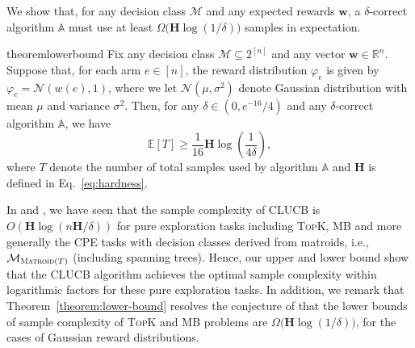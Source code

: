 \documentclass{article}
\newcommand{\Algorithm}{{\small \textsf{CLUCB}}\xspace}
\newcommand{\Rew}{\varphi}
\newcommand{\E}{\mathbb E}
\newcommand{\M}{\mathcal M}
\newcommand{\B}{\mathcal B}
\newcommand{\RR}{\mathbb R}
\DeclareMathOperator{\rank}{width}
\newcommand{\MultiIdent}{\textsc{TopK}\xspace}
\newcommand{\MultiBandit}{\textsc{MB}\xspace}
\newcommand{\Matroid}{\textsc{Matroid}\xspace}
\newcommand{\Match}{\textsc{Match}\xspace}
\newcommand{\Path}{\textsc{Path}\xspace}
\renewcommand{\vec}[1]{\boldsymbol{#1}}
\begin{document}
We show that, for any decision class $\M$ and any expected rewards $\vec w$, a $\delta$-correct algorithm $\mathbb A$ must use at least $\Omega\big(\mathbf H \log(1/\delta) \big)$ samples in expectation.
\begin{restatable}{theorem}{lowerbound}
Fix any decision class $\M\subseteq 2^{[n]}$ and any vector $\vec w \in \RR^n$.
Suppose that, for each arm $e\in [n]$, the reward distribution $\Rew_e$ is given by $\Rew_e=\mathcal N(w(e),1)$, where we let $\mathcal N(\mu, \sigma^2)$ denote Gaussian distribution with mean $\mu$ and variance $\sigma^2$. 
Then, for any $\delta \in (0,e^{-16}/4)$ and any $\delta$-correct algorithm $\mathbb A$, we have
\begin{equation}
\label{eq:lower-bound}
\E[T] \ge \frac{1}{16} \mathbf H \log\left(\frac{1}{4\delta}\right),
\end{equation}
where 
$T$ denote the number of total samples used by algorithm $\mathbb A$ and
$\mathbf H$ is defined in Eq.~\eqref{eq:hardness}.
\label{theorem:lower-bound}
\end{restatable}
%
In  and , we have seen that the sample complexity of \Algorithm is $O(\mathbf H\log(n\mathbf H/\delta))$ for pure exploration tasks including \MultiIdent, \MultiBandit and more generally the CPE tasks with decision classes derived from matroids, i.e., $\M_{\Matroid(T)}$ (including spanning trees).
Hence, our upper and lower bound show that the \Algorithm algorithm achieves the optimal sample complexity within logarithmic factors for these pure exploration tasks. 
In addition, we remark that Theorem~\ref{theorem:lower-bound} resolves the  conjecture of \citet{bubeck2013multiple} that the lower bounds of sample complexity of \MultiIdent and \MultiBandit problems are $\Omega\big(\mathbf H\log(1/\delta)\big)$, for the cases of Gaussian reward distributions.
\end{document}

